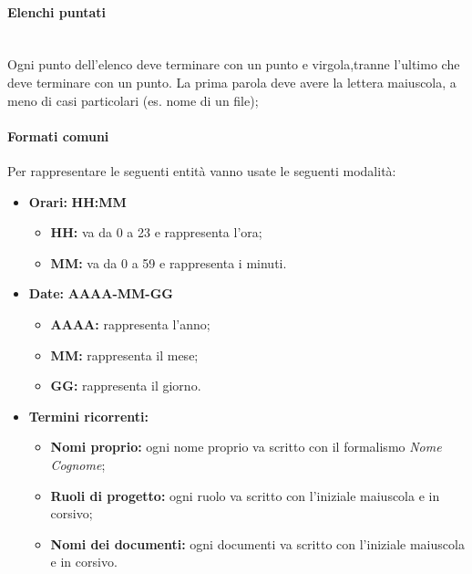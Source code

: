 		\paragraph{Elenchi puntati} \mbox{} \\
		Ogni punto dell’elenco deve terminare con un punto e virgola,tranne l’ultimo che deve terminare con un punto. La prima parola deve avere la lettera maiuscola, a meno di casi particolari (es. nome di un file);
		
		\paragraph{Formati comuni}
		Per rappresentare le seguenti entità vanno usate le seguenti modalità:
		\begin{itemize}
			
			\item \textbf{Orari:}
			\textbf{HH:MM}
				\begin{itemize}
					\item \textbf{HH:} va da 0 a 23 e rappresenta l'ora;
					\item \textbf{MM:} va da 0 a 59 e rappresenta i minuti.
				\end{itemize}
			
			\item \textbf{Date:}
			\textbf{AAAA-MM-GG}
				\begin{itemize}
					\item \textbf{AAAA:} rappresenta l'anno;
					\item \textbf{MM:} rappresenta il mese;
					\item \textbf{GG:} rappresenta il giorno.
				\end{itemize}
			
			\item \textbf{Termini ricorrenti:}
			\begin{itemize}
				\item \textbf{Nomi proprio:} ogni nome proprio va scritto con il formalismo \textit{Nome Cognome};
				\item \textbf{Ruoli di progetto:} ogni ruolo va scritto con l'iniziale maiuscola e in corsivo;
				\item \textbf{Nomi dei documenti:} ogni documenti va scritto con l'iniziale maiuscola e in corsivo.
			\end{itemize}
			
		\end{itemize}
		
